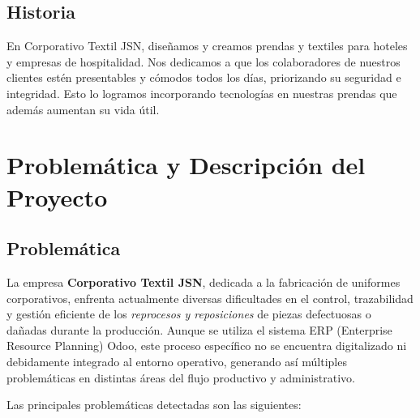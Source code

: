 \documentclass[12pt,letterpaper,spanish]{report}
\begin{document}
\section{Historia}
En Corporativo Textil JSN, diseñamos y creamos prendas y textiles para hoteles y empresas de hospitalidad.
Nos dedicamos a que los colaboradores de nuestros clientes estén presentables y cómodos todos los días, priorizando su seguridad e integridad.
Esto lo logramos incorporando tecnologías en nuestras prendas que además aumentan su vida útil.


\newpage




\chapter{Problemática y Descripción del Proyecto}
\newpage

\section{Problemática}

La empresa \textbf{Corporativo Textil JSN}, dedicada a la fabricación de uniformes corporativos, enfrenta actualmente diversas dificultades en el control, trazabilidad y gestión eficiente de los \textit{reprocesos y reposiciones} de piezas defectuosas o dañadas durante la producción. Aunque se utiliza el sistema ERP (Enterprise Resource Planning) Odoo, este proceso específico no se encuentra digitalizado ni debidamente integrado al entorno operativo, generando así múltiples problemáticas en distintas áreas del flujo productivo y administrativo.

Las principales problemáticas detectadas son las siguientes:
\end{document}
